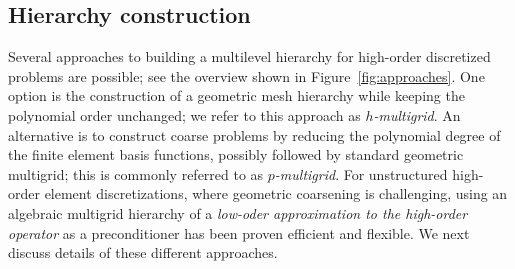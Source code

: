 \documentclass[smallcondensed,final]{svjour3}     %
\begin{document}
\subsection{Hierarchy construction}\label{subsec:hierarchy}
Several approaches to building a multilevel hierarchy for high-order
discretized problems are possible; see the overview shown in
Figure~\ref{fig:approaches}. One option is the construction of a
geometric mesh hierarchy while keeping the polynomial order unchanged;
we refer to this approach as \emph{$h$-multigrid}. An
alternative is to construct coarse problems by reducing the polynomial
degree of the finite element basis functions, possibly followed by
standard geometric multigrid; this is
commonly referred to as \emph{$p$-multigrid}. For unstructured
high-order element discretizations, where geometric coarsening is
challenging, using an algebraic multigrid hierarchy of a \emph{low-oder
approximation to the high-order operator} as a preconditioner has been
proven efficient and flexible. We next discuss details of these
different approaches.
\end{document}
